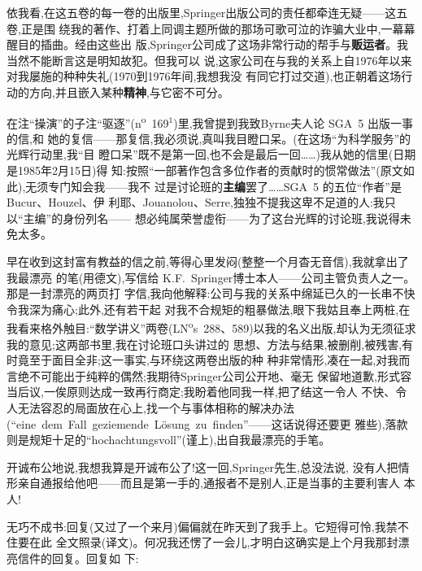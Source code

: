 依我看,在这五卷的每一卷的出版里,Springer出版公司的责任都牵连无疑——这五卷,正是围
绕我的著作、打着上同调主题所做的那场可歌可泣的诈骗大业中,一幕幕醒目的插曲。经由这些出
版,Springer公司成了这场非常行动的帮手与\textbf{贩运者}。我当然不能断言这是明知故犯。但我可以
说,这家公司在与我的关系上自\dmark{}1976年以来对我屡施的种种失礼(1970到1976年间,我想我没
有同它打过交道),也正朝着这场行动的方向,并且嵌入某种\textbf{精神},与它密不可分。

在注“操演”的子注“驱逐”(n\textsuperscript{o}~169$^{1}$)里,我曾提到我致Byrne夫人论 SGA~5 出版一事的信,和
她的复信——那复信,我必须说,真叫我目瞪口呆。(在这场“为科学服务”的光辉行动里,我“目
瞪口呆”既不是第一回,也不会是最后一回……)我从她的信里(日期是1985年2月15日)得
知:按照“一部著作包含多位作者的贡献时的惯常做法”(原文如此),无须专门知会我——我不
过是讨论班的\textbf{主编}罢了……SGA~5 的五位“作者”是Bucur、Houzel、伊
利耶、Jouanolou、Serre,独独不提我这卑不足道的人:我只以“主编”的身份列名——
想必纯属荣誉虚衔——为了这台光辉的讨论班,我说得未免太多。

早在收到这封富有教益的信之前,等得心里发闷(整整一个月杳无音信),我就拿出了我最漂亮
的笔(用德文),写信给 K.F.~Springer博士本人——公司主管负责人之一。那是一封漂亮的两页打
字信,我向他解释:公司与我的关系中绵延已久的一长串不快令我深为痛心;此外,还有若干起
对我不合规矩的粗暴做法,眼下我姑且奉上两桩,在我看来格外触目:“数学讲义”两卷(LN\textsuperscript{o}s~288、589)以我的名义出版,却认为无须征求我的意见;这两部书里,我在讨论班口头讲过的
思想、方法与结果,被删削,被残害,有时竟至于面目全非;这一事实,与环绕这两卷出版的种
种非常情形,凑在一起,对我而言绝不可能出于纯粹的偶然;我期待Springer公司公开地、毫无
保留地道歉,形式容当后议,一俟原则达成一致再行商定;我盼着他同我一样,把了结这一令人
不快、令人无法容忍的局面放在心上,找一个\dmark{}与事体相称的解决办法(“eine~dem~Fall~geziemende~Lösung~zu~finden”——这话说得还要更
雅些),落款则是规矩十足的“hochachtungsvoll”(谨上),出自我最漂亮的手笔。

开诚布公地说,我想我算是开诚布公了!这一回,Springer先生,总没法说,
没有人把情形亲自通报给他吧——而且是第一手的,通报者不是别人,正是当事的主要利害人
本人!

无巧不成书:回复(又过了一个来月)偏偏就在昨天到了我手上。它短得可怜,我禁不住要在此
全文照录(译文)。何况我还愣了一会儿,才明白这确实是上个月我那封漂亮信件的回复。回复如
下:

